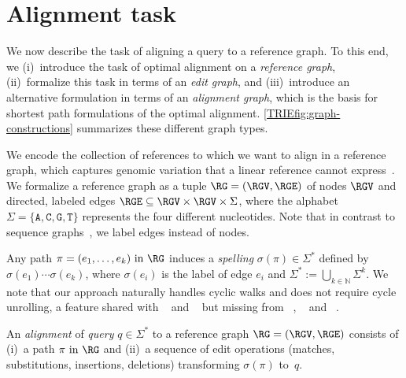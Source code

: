 \section{Alignment task}
\label{TRIEsec:task}

We now describe the task of aligning a query to a reference graph. To this end,
we (i)~introduce the task of optimal alignment on a \emph{reference graph},
(ii)~formalize this task in terms of an \emph{edit graph}, and (iii)~introduce an
alternative formulation in terms of an \emph{alignment graph}, which is the
basis for shortest path formulations of the optimal alignment.
%
\cref{TRIEfig:graph-constructions} summarizes these different graph types.

We encode the collection of references to which we want to align in a reference
graph, which captures genomic variation that a linear reference cannot
express~\cite{paten_genome_2017,garrison_variation_2018}.
%
We formalize a reference graph as a tuple $\RG=(\RGV,\RGE)$ of nodes $\RGV$ and
directed, labeled edges $\RGE \subseteq \RGV \times \RGV \times \Sigma$, where
the alphabet $\Sigma=\{\texttt{A},\texttt{C},\texttt{G},\texttt{T}\}$ represents
the four different nucleotides.
%
Note that in contrast to sequence graphs~\cite{rautiainen_aligning_2017}, we
label edges instead of nodes.

Any path $\pi=(e_1,\dots,e_k) \text { in } \RG$ induces a \emph{spelling}
$\sigma(\pi) \in \Sigma^*$ defined by $\sigma(e_1)\cdots\sigma(e_k)$, where
$\sigma(e_i)$ is the label of edge $e_i$ and $\Sigma^* := \bigcup_{k \in
\mathbb{N}} \Sigma^k$. We note that our approach naturally handles cyclic walks
and does not require cycle unrolling, a feature shared with
\bitparallel~\cite{rautiainen_bitparallel_2019} and
\brownie~\cite{heydari_browniealigner_2018} but missing from
\vg~\cite{garrison_variation_2018}, \pasgal~\cite{jain_accelerating_2019} and
\valigntool~\cite{kavya_sequence_2019}.

An \emph{alignment} of \emph{query} $q \in \Sigma^*$ to a reference graph
$\RG=(\RGV,\RGE)$ consists of (i)~a path $\pi \text{ in } \RG$ and (ii)~a
sequence of edit operations (matches, substitutions, insertions, deletions)
transforming $\sigma(\pi)$ to~$q$.

